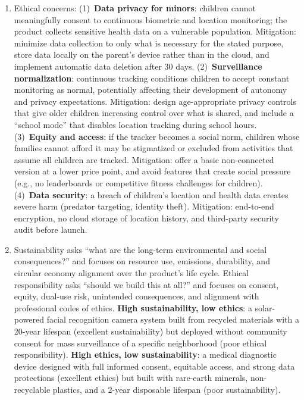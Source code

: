 \begin{enumerate}[leftmargin=1.5em]
\item Ethical concerns: (1)~\textbf{Data privacy for minors}: children cannot meaningfully consent to continuous biometric and location monitoring; the product collects sensitive health data on a vulnerable population. Mitigation: minimize data collection to only what is necessary for the stated purpose, store data locally on the parent's device rather than in the cloud, and implement automatic data deletion after 30 days. (2)~\textbf{Surveillance normalization}: continuous tracking conditions children to accept constant monitoring as normal, potentially affecting their development of autonomy and privacy expectations. Mitigation: design age-appropriate privacy controls that give older children increasing control over what is shared, and include a ``school mode'' that disables location tracking during school hours. (3)~\textbf{Equity and access}: if the tracker becomes a social norm, children whose families cannot afford it may be stigmatized or excluded from activities that assume all children are tracked. Mitigation: offer a basic non-connected version at a lower price point, and avoid features that create social pressure (e.g., no leaderboards or competitive fitness challenges for children). (4)~\textbf{Data security}: a breach of children's location and health data creates severe harm (predator targeting, identity theft). Mitigation: end-to-end encryption, no cloud storage of location history, and third-party security audit before launch.
\item Sustainability asks ``what are the long-term environmental and social consequences?'' and focuses on resource use, emissions, durability, and circular economy alignment over the product's life cycle. Ethical responsibility asks ``should we build this at all?'' and focuses on consent, equity, dual-use risk, unintended consequences, and alignment with professional codes of ethics. \textbf{High sustainability, low ethics}: a solar-powered facial recognition camera system built from recycled materials with a 20-year lifespan (excellent sustainability) but deployed without community consent for mass surveillance of a specific neighborhood (poor ethical responsibility). \textbf{High ethics, low sustainability}: a medical diagnostic device designed with full informed consent, equitable access, and strong data protections (excellent ethics) but built with rare-earth minerals, non-recyclable plastics, and a 2-year disposable lifespan (poor sustainability).
\end{enumerate}
